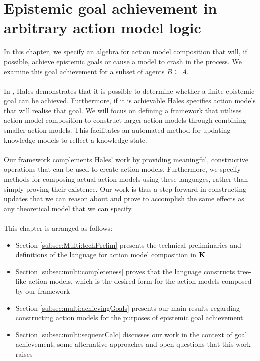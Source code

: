 \chapter{Epistemic goal achievement in arbitrary action model logic} \label{chapter:Multiagent}

In this chapter, we specify an algebra for action model composition that will, if possible, achieve
epistemic goals or cause a model to crash in the process.
We examine this goal achievement for a subset of agents $B \subseteq A$.\\
\\
In \cite{hales13synthesis}, Hales demonstrates that it is possible to determine whether a
finite epistemic goal can be achieved.
Furthermore, if it is achievable Hales specifies action models that will realise
that goal.
We will focus on defining a framework that utilises action model composition to construct
larger action models through combining smaller action models.
This facilitates an automated method for updating knowledge models to reflect a
knowledge state.\\
\\
Our framework complements Hales' work by providing meaningful, constructive operations
that can be used to create action models.
Furthermore, we specify methods for composing actual action models using these languages, rather
than simply proving their existence.
Our work is thus a step forward in constructing updates that we can reason about and prove to
accomplish the same effects as any theoretical model that we can specify.\\
\\
This chapter is arranged as follows:

\begin{itemize}
	\item Section \ref{subsec:Multi:techPrelim} presents the technical preliminaries and definitions
		of the language for action model composition in $\bf K$
	\item Section \ref{subsec:multi:completeness} proves that the language
  constructs tree-like action
		models, which is the desired form for the action models composed by our framework
	\item Section \ref{subsec:multi:achievingGoals} presents our main results regarding constructing
		action models for the purposes of epistemic goal achievement
	\item Section \ref{subsec:multi:sequentCalc} discusses our work in the context of goal
		achievement, some alternative approaches and open questions that this work raises
\end{itemize}

